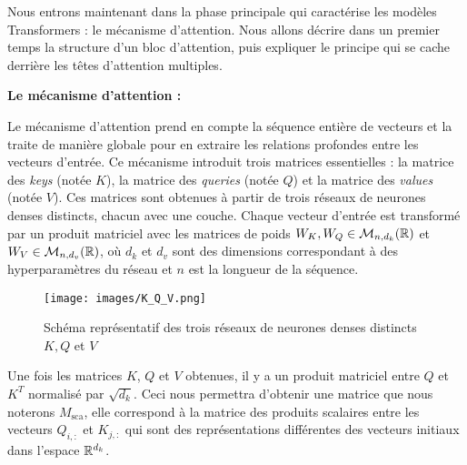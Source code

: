 \documentclass[12pt]{article}
\theoremstyle{definition}
\begin{document}
Nous entrons maintenant dans la phase principale qui caractérise les modèles Transformers : le mécanisme d'attention. Nous allons décrire dans un premier temps la structure d'un bloc d'attention, puis expliquer le principe qui se cache derrière les têtes d'attention multiples. 

\textbf{Le mécanisme d'attention :}

Le mécanisme d'attention prend en compte la séquence entière de vecteurs et la traite de manière globale pour en extraire les relations profondes entre les vecteurs d'entrée. Ce mécanisme introduit trois matrices essentielles : la matrice des \textit{keys} (notée \(K\)), la matrice des \textit{queries} (notée \(Q\)) et la matrice des \textit{values} (notée \(V\)). Ces matrices sont obtenues à partir de trois réseaux de neurones denses distincts, chacun avec une couche. Chaque vecteur d'entrée est transformé par un produit matriciel avec les matrices de poids \(W_K, W_Q \in \mathcal{M}_{n,d_k}(\mathbb{R})\) et \(W_V \in \mathcal{M}_{n,d_v}(\mathbb{R})\), où \(d_k\) et \(d_v\) sont des dimensions correspondant à des hyperparamètres du réseau et \(n\) est la longueur de la séquence.



\begin{figure*}[!h]
	\centering
	\texttt{[image: images/K\_Q\_V.png]}
	\caption{Schéma représentatif des trois réseaux de neurones denses distincts $K,Q$ et $V$ }
\end{figure*}



 Une fois les matrices \(K\), \(Q\) et \(V\)  obtenues, il y a un produit matriciel entre \(Q\) et \(K^T\) normalisé par \(\sqrt{d_k}\). Ceci nous permettra d'obtenir une matrice que nous noterons \(M_{\text{sca}}\), elle correspond à la matrice des produits scalaires entre les vecteurs \(Q_{i,:}\) et \(K_{j,:}\) qui sont des représentations différentes des vecteurs initiaux dans l'espace $\mathbb{R}^{d_k}$.
\end{document}
